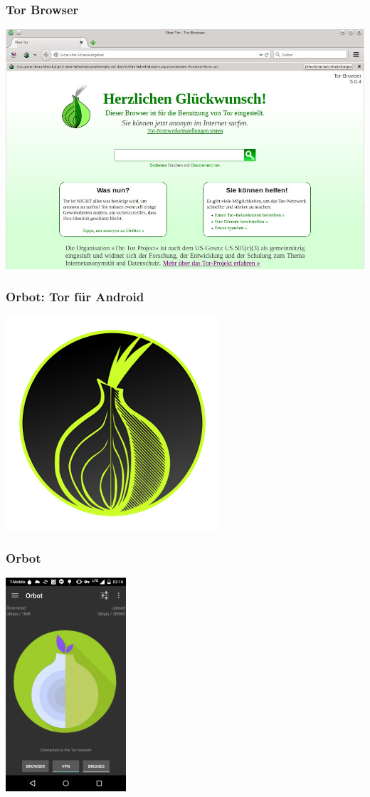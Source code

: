   \begin{frame}
    \frametitle{Tor Browser}
    \includegraphics[width=1\textwidth, height=0.7\textheight]{img/tor_browser.jpg}          
  \end{frame}
  
  \begin{frame}
    \frametitle{Orbot: Tor für Android}
    \includegraphics[height=0.7\textheight]{img/orbot.png}              
  \end{frame}
  
  \begin{frame}
    \frametitle{Orbot}
    \includegraphics[height=0.7\textheight]{img/orbot1.png}                  
  \end{frame}
